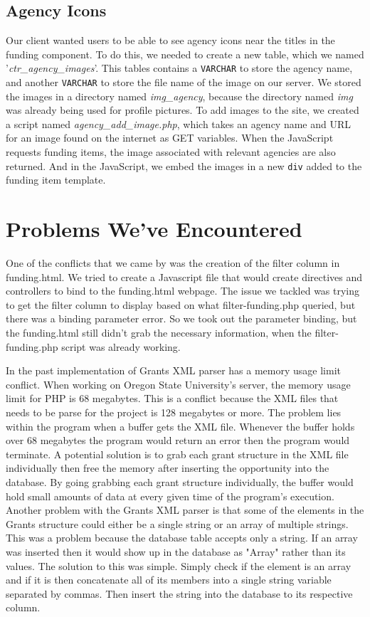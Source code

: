 \documentclass[onecolumn]{IEEEtran}
\begin{document}
\subsection{Agency Icons}
Our client wanted users to be able to see agency icons near the titles in the funding component. To do this, we needed to create a new table, which we named '\textit{ctr\_agency\_images}'. This tables contains a \texttt{VARCHAR} to store the agency name, and another \texttt{VARCHAR} to store the file name of the image on our server. We stored the images in a directory named \textit{img\_agency}, because the directory named \textit{img} was already being used for profile pictures. To add images to the site, we created a script named \textit{agency\_add\_image.php}, which takes an agency name and URL for an image found on the internet as GET variables. When the JavaScript requests funding items, the image associated with relevant agencies are also returned. And in the JavaScript, we embed the images in a new \texttt{div} added to the funding item template. 

\section{Problems We've Encountered}
One of the conflicts that we came by was the creation of the filter column in funding.html. We tried to create a Javascript file that would create directives and controllers to bind to the funding.html webpage. The issue we tackled was trying to get the filter column to display based on what filter-funding.php queried, but there was a binding parameter error. So we took out the parameter binding, but the funding.html still didn't grab the necessary information, when the filter-funding.php script was already working. 

In the past implementation of Grants XML parser has a memory usage limit conflict. When working on Oregon State University's server, the memory usage limit for PHP is 68 megabytes. This is a conflict because the XML files that needs to be parse for the project is 128 megabytes or more. The problem lies within the program when a buffer gets the XML file. Whenever the buffer holds over 68 megabytes the program would return an error then the program would terminate. A potential solution is to grab each grant structure in the XML file individually then free the memory after inserting the opportunity into the database. By going grabbing each grant structure individually, the buffer would hold small amounts of data at every given time of the program's execution. Another problem with the Grants XML parser is that some of the elements in the Grants structure could either be a single string or an array of multiple strings. This was a problem because the database table accepts only a string. If an array was inserted then it would show up in the database as "Array" rather than its values. The solution to this was simple. Simply check if the element is an array and if it is then concatenate all of its members into a single string variable separated by commas.  Then insert the string into the database to its respective column.  
\end{document}
